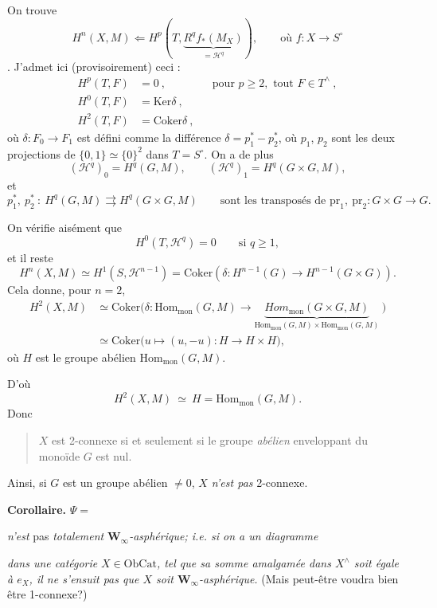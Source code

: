 \documentclass[11pt]{article}
\newcommand{\printedpage}[1]{\marginpar{\footnotesize p.~#1}}
\newcommand{\msp}[1]{\marginpar{\footnotesize [#1]}}
\newcommand{\Hom}{\mathrm{Hom}}
\newcommand{\Ob}{\mathrm{Ob}}
\newcommand{\Cat}{\mathrm{Cat}}
\newcommand{\pr}{\mathrm{pr}}
\newcommand{\Ker}{\mathrm{Ker}}
\newcommand{\Coker}{\mathrm{Coker}}
\newcommand{\mon}{\mathrm{mon}}
\begin{document}
On trouve
\[
H^n(X,M) \Longleftarrow H^p(T, \underbrace{R^q f_*(M_X)}_{= \mathcal{H}^q}), \qquad \text{où } f : X \longrightarrow S^\circ
\]
. J'admet ici (provisoirement) ceci : %
\[
\begin{aligned}
H^p(T,F) &= 0 \ , &&\text{pour } p\geq 2, \text{ tout } F\in T^\wedge \ ,\\
H^0(T,F) &= \Ker\delta \ , &&\\
H^2(T,F) &= \Coker\delta \ , && %
\end{aligned}
\]
\printedpage{3}
où $\delta : F_0 \longrightarrow F_1$ est défini comme la différence $\delta = p_1^* - p_2^*$, où $p_1$, $p_2$ sont les deux projections de $\{0,1\}\simeq\{0\}^2$ dans $T = S^\circ$. On a de plus
\[
(\mathcal{H}^q)_0 = H^q(G,M), \qquad (\mathcal{H}^q)_1 = H^q(G\times G, M),
\]
et
\[
p_1^*,\ p_2^*\ :\ H^q(G,M) \rightrightarrows H^q(G{\times}G, M) \qquad \text{sont les transposés de } \pr_1,\ \pr_2 : G\times G\longrightarrow G.
\]

\msp{page 4}
On vérifie aisément que
\[
H^0(T,\mathcal{H}^q) = 0 \qquad \text{si } q\geq 1,
\]
et il reste
\[
H^n(X,M) \simeq H^1(S,\mathcal{H}^{n-1}) = \Coker(\delta : H^{n-1}(G) \longrightarrow H^{n-1}(G\times G)). %
\]
Cela donne, pour $n = 2$,
\[
\begin{aligned}
H^2(X,M) &\simeq \Coker\Big(\delta : \Hom_\mon(G,M) \longrightarrow \underbrace{\mathit{Hom}_\mon(G\times G, M)}_{\Hom_\mon(G,M)\times\Hom_\mon(G,M)} \ \Big)\\
&\simeq \Coker\Big(u\longmapsto (u,-u) : H \longrightarrow H\times H\Big),
\end{aligned}
\]
où $H$ est le groupe abélien $\Hom_\mon(G,M)$.

D'où
\[
H^2(X,M) \ \simeq\ H = \Hom_\mon(G,M).
\]
Donc
\begin{quote}
$X$ est 2-connexe si et seulement si le groupe \textit{abélien} enveloppant du monoïde $G$ est nul.
\end{quote}

Ainsi, si $G$ est un groupe abélien $\neq 0$, $X$ \textit{n'est pas} 2-connexe.

\textbf{Corollaire.} $\Psi = {}$
\textit{n'est} pas \textit{totalement} $\mathbf{W}_\infty$\textit{-asphérique; i.e. si on a un diagramme} 
\textit{dans une catégorie} $X\in\Ob\Cat$\textit{, tel que sa somme amalgamée dans $X^\wedge$ soit égale à $e_X$, il ne s'ensuit pas que $X$ soit $\mathbf{W}_\infty$-asphérique.} (Mais peut-être voudra bien être 1-connexe?)
\end{document}
